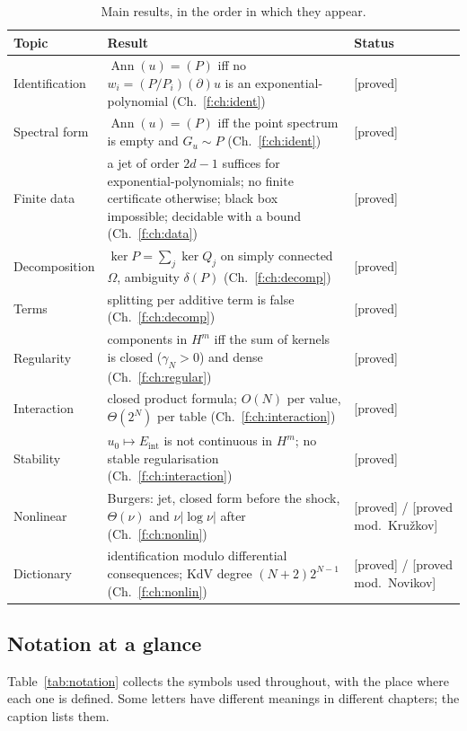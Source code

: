 \documentclass[11pt]{article}
\theoremstyle{plain}
\theoremstyle{definition}
\theoremstyle{remark}
\DeclareMathOperator{\Ann}{Ann}             %
\newcommand{\Eint}{E_{\mathrm{int}}}        %
\newcommand{\badge}[2]{\textcolor{#1}{\textsf{\footnotesize[#2]}}}
\newcommand{\proved}[1][]{\badge{cC}{proved#1}}
\newcommand{\modulo}[1]{\badge{cD}{proved mod.\ #1}}
\begin{document}
\begin{table}[!htb]
\centering\small
\begin{tabular}{@{}L{2.8cm}L{8.6cm}L{3.0cm}@{}}
\toprule
Topic & Result & Status\\\midrule
Identification & $\Ann(u)=(P)$ iff no $w_i=(P/P_i)(\partial)u$ is an exponential-polynomial (Ch.~\ref{f:ch:ident}) & \proved\\
Spectral form & $\Ann(u)=(P)$ iff the point spectrum is empty and $G_u\sim P$ (Ch.~\ref{f:ch:ident}) & \proved\\
Finite data & a jet of order $2d-1$ suffices for exponential-polynomials; no finite certificate otherwise; black box impossible; decidable with a bound (Ch.~\ref{f:ch:data}) & \proved\\
Decomposition & $\ker P=\sum_j\ker Q_j$ on simply connected $\Omega$, ambiguity $\delta(P)$ (Ch.~\ref{f:ch:decomp}) & \proved\\
Terms & splitting per additive term is false (Ch.~\ref{f:ch:decomp}) & \proved\\
Regularity & components in $H^m$ iff the sum of kernels is closed ($\gamma_N>0$) and dense (Ch.~\ref{f:ch:regular}) & \proved\\
Interaction & closed product formula; $O(N)$ per value, $\Theta(2^N)$ per table (Ch.~\ref{f:ch:interaction}) & \proved\\
Stability & $u_0\mapsto\Eint$ is not continuous in $H^m$; no stable regularisation (Ch.~\ref{f:ch:interaction}) & \proved\\
Nonlinear & Burgers: jet, closed form before the shock, $\Theta(\nu)$ and $\nu|\log\nu|$ after (Ch.~\ref{f:ch:nonlin}) & \proved{} / \modulo{Kru\v zkov}\\
Dictionary & identification modulo differential consequences; KdV degree $(N+2)2^{N-1}$ (Ch.~\ref{f:ch:nonlin}) & \proved{} / \modulo{Novikov}\\\bottomrule
\end{tabular}
\caption{Main results, in the order in which they appear.}\label{f:tab:results}
\end{table}

\subsection{Notation at a glance}

Table~\ref{tab:notation} collects the symbols used throughout, with the place where each one is defined. Some letters have different meanings in different chapters; the caption lists them.
\end{document}
